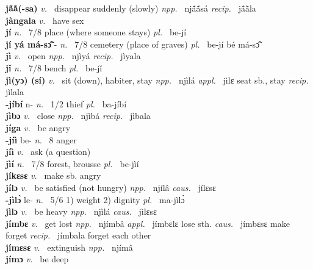 \noindent
{\bfseries jã́ã̀(-sa)}  {\itshape v.~} disappear suddenly (slowly)   {\itshape npp.~} njã́ã́sá {\itshape recip.~} jã́ã̀la  \\ 
{\bfseries jàngala}  {\itshape v.~} have sex    \\ 
{\bfseries jí}  {\itshape n.~} 7/8 place (where someone stays) {\itshape pl.~} be-jí    \\ 
{\bfseries jí yá má-sɔ̃̂} - {\itshape n.~} 7/8 cemetery (place of graves) {\itshape pl.~} be-jí bé má-sɔ̃̂    \\ 
{\bfseries jì}  {\itshape v.~} open   {\itshape npp.~} njìyá {\itshape recip.~} jìyala  \\ 
{\bfseries  jǐ}  {\itshape n.~} 7/8 bench {\itshape pl.~} be-jǐ    \\ 
{\bfseries jì(yɔ) (sí)}  {\itshape v.~} sit (down), habiter, stay   {\itshape npp.~} njìlá {\itshape appl.~} jìlɛ seat sb., stay {\itshape recip.~} jìlala  \\ 
{\bfseries -jíbí} n- {\itshape n.~} 1/2 thief {\itshape pl.~} ba-jíbí    \\ 
{\bfseries jìbɔ}  {\itshape v.~} close {\itshape npp.~} njìbá {\itshape recip.~} jìbala  \\ 
{\bfseries jíga}  {\itshape v.~} be angry    \\ 
{\bfseries -jíì} be- {\itshape n.~} 8 anger    \\ 
{\bfseries jíì}  {\itshape v.~} ask (a question)    \\ 
{\bfseries jìí}  {\itshape n.~} 7/8 forest, brousse {\itshape pl.~} be-jìí    \\ 
{\bfseries jíkɛsɛ}  {\itshape v.~} make sb. angry    \\ 
{\bfseries jílɔ}  {\itshape v.~} be satisfied (not hungry)   {\itshape npp.~} njílâ {\itshape caus.~} jílɛsɛ  \\ 
{\bfseries -jìlɔ̀} le- {\itshape n.~} 5/6 1) weight 2) dignity {\itshape pl.~} ma-jìlɔ̀    \\ 
{\bfseries jìlɔ}  {\itshape v.~} be heavy   {\itshape npp.~} njìlá {\itshape caus.~} jìlɛsɛ  \\ 
{\bfseries jímbɛ}  {\itshape v.~} get lost   {\itshape npp.~} njímbâ {\itshape appl.~} jímbɛlɛ lose sth. {\itshape caus.~} jímbɛsɛ make forget {\itshape recip.~} jímbala forget each other  \\ 
{\bfseries jímɛsɛ}  {\itshape v.~} extinguish   {\itshape npp.~} njímâ  \\ 
{\bfseries jímɔ}  {\itshape v.~} be deep    \\ 
